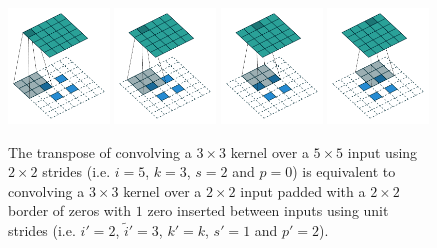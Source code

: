\documentclass{report}
\begin{document}
\begin{figure}[p]
    \centering
    \includegraphics[width=0.24\textwidth]{pdf/no_padding_strides_transposed_00.pdf}
    \includegraphics[width=0.24\textwidth]{pdf/no_padding_strides_transposed_01.pdf}
    \includegraphics[width=0.24\textwidth]{pdf/no_padding_strides_transposed_02.pdf}
    \includegraphics[width=0.24\textwidth]{pdf/no_padding_strides_transposed_03.pdf}
    \caption{\label{fig:no_padding_strides_transposed} The transpose of
        convolving a $3 \times 3$ kernel over a $5 \times 5$ input using $2
        \times 2$ strides (i.e. $i = 5$, $k = 3$, $s = 2$ and $p = 0$) is
        equivalent to convolving a $3 \times 3$ kernel over a $2 \times 2$ input
        padded with a $2 \times 2$ border of zeros with $1$ zero inserted
        between inputs using unit strides (i.e. $i' = 2$, $\tilde{i}' = 3$, $k'
        = k$, $s' = 1$ and $p' = 2$).}
\end{figure}
\end{document}
